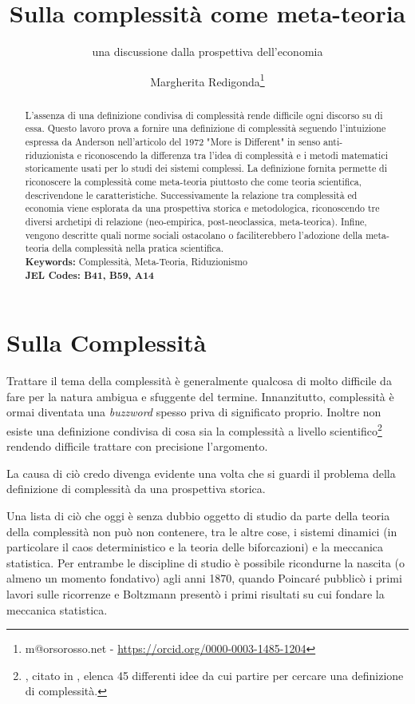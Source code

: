 \documentclass[a4paper, headings=standardclasses]{scrartcl}
\title{Sulla complessità come meta-teoria\let\thefootnote\relax\footnotetext{
		Versioni precedenti di questo lavoro sono state presentate alla 24esima ESHET Summer School e alla 2023 INEM Conference. \\
		L'ultima versione di questo lavoro è disponibile online \url{https://github.com/TnTo/complexity-economics/}.
}}
\subtitle{una discussione dalla prospettiva dell'economia}
\author{Margherita Redigonda\thanks{m@orsorosso.net - \url{https://orcid.org/0000-0003-1485-1204}}}
\begin{document}
\maketitle

\begin{abstract}
	L'assenza di una definizione condivisa di complessità rende difficile ogni discorso su di essa.
	Questo lavoro prova a fornire una definizione di complessità seguendo l'intuizione espressa da Anderson nell'articolo del 1972 "More is Different" in senso anti-riduzionista e riconoscendo la differenza tra l'idea di complessità e i metodi matematici storicamente usati per lo studi dei sistemi complessi.
	La definizione fornita permette di riconoscere la complessità come meta-teoria piuttosto che come teoria scientifica, descrivendone le caratteristiche.
	Successivamente la relazione tra complessità ed economia viene esplorata da una prospettiva storica e metodologica, riconoscendo tre diversi archetipi di relazione (neo-empirica, post-neoclassica, meta-teorica).
	Infine, vengono descritte quali norme sociali ostacolano o faciliterebbero l'adozione della meta-teoria della complessità nella pratica scientifica. \\
	\textbf{Keywords:} Complessità, Meta-Teoria, Riduzionismo\\
	\textbf{JEL Codes: B41, B59, A14}
\end{abstract}

\section{Sulla Complessità}
Trattare il tema della complessità è generalmente qualcosa di molto difficile da fare per la natura ambigua e sfuggente del termine.
Innanzitutto, complessità è ormai diventata una \textit{buzzword} spesso priva di significato proprio.
Inoltre non esiste una definizione condivisa di cosa sia la complessità a livello scientifico\footnote{\textcite{horgan2015}, citato in \textcite{holt2011}, elenca 45 differenti idee da cui partire per cercare una definizione di complessità.} rendendo difficile trattare con precisione l'argomento.

La causa di ciò credo divenga evidente una volta che si guardi il problema della definizione di complessità da una prospettiva storica.

Una lista di ciò che oggi è senza dubbio oggetto di studio da parte della teoria della complessità non può non contenere, tra le altre cose, i sistemi dinamici (in particolare il caos deterministico e la teoria delle biforcazioni) e la meccanica statistica. Per entrambe le discipline di studio è possibile ricondurne la nascita (o almeno un momento fondativo) agli anni 1870, quando Poincaré pubblicò i primi lavori sulle ricorrenze e Boltzmann presentò i primi risultati su cui fondare la meccanica statistica.
\end{document}
